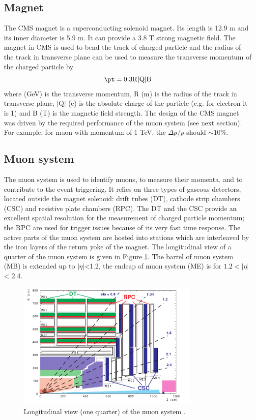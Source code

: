 \subsection{Magnet}\label{subsec:CMS_Magnet}
The CMS magnet is a superconducting solenoid magnet. Its length is 12.9 m and its inner diameter is 5.9 m. It can provide a 3.8 T strong magnetic field.
The magnet in CMS is used to bend the track of charged particle and the radius of the track in transverse plane can be used to measure the transverse momentum of the charged particle by
$$\mathrm{\pt=0.3R|Q|B}$$
where \pt (GeV) is the transverse momentum, R (m) is the radius of the track in transverse plane, $|\mathrm{Q}|$ (e) is the absolute charge of the particle (e.g. for electron it is 1) and B (T) is the magnetic field strength.
The design of the CMS magnet was driven by the required performance of the muon system (see next section). For example, for muon with momentum of 1 TeV, the $\Delta p/p$ should $\sim10\%$.

\subsection{Muon system}\label{subsec:CMS_muon}
The muon system is used to identify muons, to measure their momenta, and to contribute to the event triggering. It relies on three types of gaseous detectors, located outside the
magnet solenoid: drift tubes (DT), cathode strip chambers (CSC) and resistive plate chambers (RPC). The DT and the CSC provide an excellent spatial resolution for the measurement of charged particle momentum; the RPC are used for trigger issues because of its very fast time response. The active parts of the muon system are hosted into stations which are interleaved by the iron layers of the return yoke of the magnet. The longitudinal view of a quarter of the muon system is given in Figure \ref{fig:CMS_Muon}. The barrel of muon system (MB) is extended up to $|\eta|$<1.2, the endcap of muon system (ME) is for $1.2<|\eta|$ < 2.4.

\begin{figure}[h!]
\begin{center}
\includegraphics[width=0.8\textwidth]{figures/CMS/Muon/Muon.png}
\caption{Longitudinal view (one quarter) of the muon system \cite{Chatrchyan:2008aa}.}
\label{fig:CMS_Muon}
\end{center}
\end{figure}

